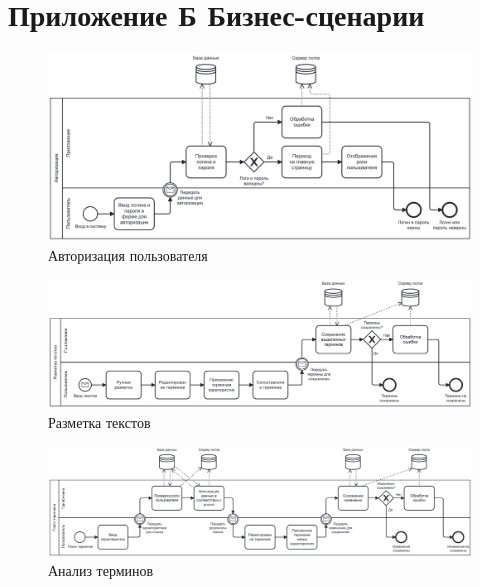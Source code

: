 \section*{Приложение Б Бизнес-сценарии}

\begin{figure}
	\centering
	\includegraphics[width=\textwidth ]{img/BPMN/1.png}
	\caption{Авторизация пользователя}
	\label{fig:bpmn1}
\end{figure} 

\begin{figure}
	\centering
	\includegraphics[width=\textwidth ]{img/BPMN/2.png}
	\caption{Разметка текстов}
	\label{fig:bpmn2}
\end{figure} 

\begin{figure}
	\centering
	\includegraphics[width=\textwidth ]{img/BPMN/3.png}
	\caption{Анализ терминов}
	\label{fig:bpmn3}
\end{figure} 

\pagebreak